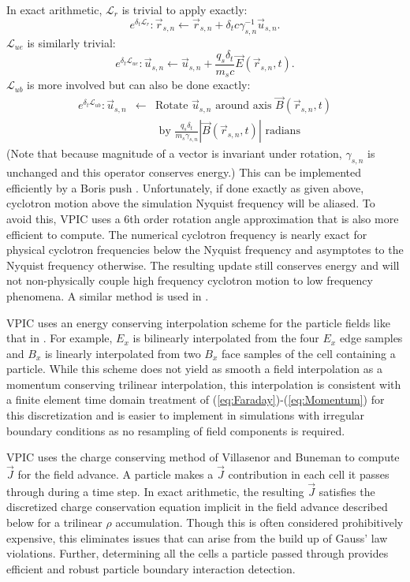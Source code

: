 \documentclass[aps,prl,preprint,preprintnumbers,groupedaddress]{revtex4}
\newcommand{\vecr}{\vec{r}}
\newcommand{\vecu}{\vec{u}}
\newcommand{\vecJ}{\vec{J}}
\newcommand{\vecE}{\vec{E}}
\newcommand{\vecB}{\vec{B}}
\newcommand{\op}{\mathcal{L}}
\newcommand{\eq}[1]{(\ref{eq:#1})}
\begin{document}
In exact arithmetic, $\op_r$ is trivial to apply exactly:
\begin{equation}
e^{\delta_t\op_r} : \vecr_{s,n} \leftarrow \vecr_{s,n} +
\delta_t c\gamma_{s,n}^{-1}\vecu_{s,n}
.
\end{equation}
$\op_{ue}$ is similarly trivial:
\begin{equation}
e^{\delta_t\op_{ue}} : \vecu_{s,n} \leftarrow \vecu_{s,n} +
\frac{q_s\delta_t}{m_s c} \vecE\left(\vecr_{s,n},t\right)
.
\end{equation}
$\op_{ub}$ is more involved but can also be done exactly:
\begin{eqnarray}
e^{\delta_t\op_{ub}} : \vecu_{s,n} &\leftarrow& \text{Rotate } \vecu_{s,n} \text{ around axis } \vecB\left(\vecr_{s,n},t\right) \nonumber\\
& &\text{ by } \frac{q_s\delta_t}{m_s\gamma_{s,n}}\left|\vecB\left(\vecr_{s,n},t\right)\right|
\text{ radians }
\end{eqnarray}
(Note that because magnitude of a vector is invariant under rotation,
$\gamma_{s,n}$ is unchanged and this operator conserves energy.)  This
can be implemented efficiently by a Boris push \cite{Boris_1970}.
Unfortunately, if done exactly as given above, cyclotron motion above
the simulation Nyquist frequency will be aliased.  To avoid this, VPIC
uses a 6th order rotation angle approximation that is also more
efficient to compute.  The numerical cyclotron frequency is nearly
exact for physical cyclotron frequencies below the Nyquist frequency
and asymptotes to the Nyquist frequency otherwise.  The resulting
update still conserves energy and will not non-physically couple high
frequency cyclotron motion to low frequency phenomena.  A similar
method is used in \cite{Blahovec_et_al_2000}.

VPIC uses an energy conserving interpolation scheme for the particle
fields like that in \cite{Eastwood_et_al_1995}.  For example, $E_x$ is
bilinearly interpolated from the four $E_x$ edge samples and $B_x$ is
linearly interpolated from two $B_x$ face samples of the cell
containing a particle.  While this scheme does not yield as smooth a
field interpolation as a momentum conserving trilinear interpolation,
this interpolation is consistent with a finite element time domain
treatment of \eq{Faraday}-\eq{Momentum} for this discretization
\cite{Eastwood_et_al_1995} and is easier to implement in simulations
with irregular boundary conditions as no resampling of field
components is required.

VPIC uses the charge conserving method of Villasenor and Buneman
\cite{Villasenor_Buneman_1992} to compute $\vecJ$ for the
field advance.  A particle makes a $\vecJ$ contribution in each cell
it passes through during a time step.  In exact arithmetic, the
resulting $\vecJ$ satisfies the discretized charge conservation
equation implicit in the field advance described below for a trilinear
$\rho$ accumulation.  Though this is often considered prohibitively
expensive, this eliminates issues that can arise from the build up of
Gauss' law violations.  Further, determining all the cells a particle
passed through provides efficient and robust particle boundary
interaction detection.
\end{document}
